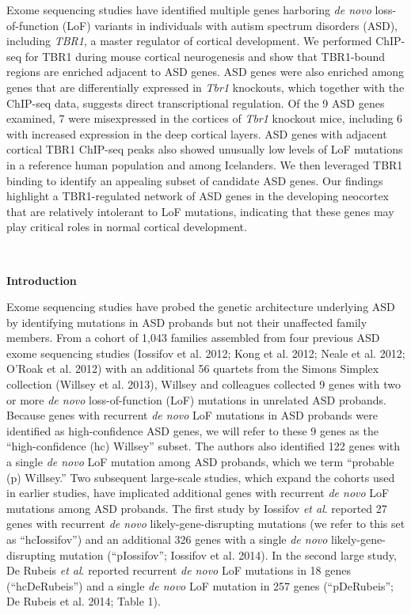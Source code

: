 \documentclass[]{article}
\begin{document}
Exome sequencing studies have identified multiple genes harboring
\emph{de novo} loss-of-function (LoF) variants in individuals with
autism spectrum disorders (ASD), including \emph{TBR1}, a master
regulator of cortical development. We performed ChIP-seq for TBR1 during
mouse cortical neurogenesis and show that TBR1-bound regions are
enriched adjacent to ASD genes. ASD genes were also enriched among genes
that are differentially expressed in \emph{Tbr1} knockouts, which
together with the ChIP-seq data, suggests direct transcriptional
regulation. Of the 9 ASD genes examined, 7 were misexpressed in the
cortices of \emph{Tbr1} knockout mice, including 6 with increased
expression in the deep cortical layers. ASD genes with adjacent cortical
TBR1 ChIP-seq peaks also showed unusually low levels of LoF mutations in
a reference human population and among Icelanders. We then leveraged
TBR1 binding to identify an appealing subset of candidate ASD genes. Our
findings highlight a TBR1-regulated network of ASD genes in the
developing neocortex that are relatively intolerant to LoF mutations,
indicating that these genes may play critical roles in normal cortical
development.

\textbf{\\
}

\textbf{Introduction}

Exome sequencing studies have probed the genetic architecture underlying
ASD by identifying mutations in ASD probands but not their unaffected
family members. From a cohort of 1,043 families assembled from four
previous ASD exome sequencing studies (Iossifov et al. 2012; Kong et al.
2012; Neale et al. 2012; O'Roak et al. 2012) with an additional 56
quartets from the Simons Simplex collection (Willsey et al. 2013),
Willsey and colleagues collected 9 genes with two or more \emph{de novo}
loss-of-function (LoF) mutations in unrelated ASD probands. Because
genes with recurrent \emph{de novo} LoF mutations in ASD probands were
identified as high-confidence ASD genes, we will refer to these 9 genes
as the ``high-confidence (hc) Willsey'' subset. The authors also
identified 122 genes with a single \emph{de novo} LoF mutation among ASD
probands, which we term ``probable (p) Willsey.'' Two subsequent
large-scale studies, which expand the cohorts used in earlier studies,
have implicated additional genes with recurrent \emph{de novo} LoF
mutations among ASD probands. The first study by Iossifov \emph{et al}.
reported 27 genes with recurrent \emph{de novo} likely-gene-disrupting
mutations (we refer to this set as ``hcIossifov'') and an additional 326
genes with a single \emph{de novo} likely-gene-disrupting mutation
(``pIossifov''; Iossifov et al. 2014). In the second large study, De
Rubeis \emph{et al}. reported recurrent \emph{de novo} LoF mutations in
18 genes (``hcDeRubeis'') and a single \emph{de novo} LoF mutation in
257 genes (``pDeRubeis''; De Rubeis et al. 2014; Table 1).
\end{document}
